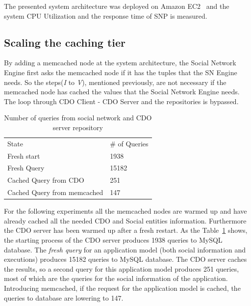 The presented system architecture was deployed on Amazon EC2~\cite{amazon_url} and the system CPU Utilization and the response time of SNP is measured.

\subsection{Scaling the caching tier}
\label{sec:eval_memcache}
By adding a memcached node at the system architecture, the Social Network Engine first asks the memcached node if it has the tuples that the SN Engine needs. So the steps(\emph{I} to \emph{V}), mentioned previously, are not necessary if the memcached node has cached the values that the Social Network Engine needs. The loop through CDO CIient - CDO Server and the repositories is bypassed. 

\begin{table}[]
\centering
\begin{tabular}{ll}
State        & \# of Queries \\
Fresh start  & 1938          \\
Fresh Query  & 15182         \\
Cached Query from CDO & 251           \\
Cached Query from memcached & 147  
\end{tabular}
\caption{Number of queries from social network and CDO server repository}
\label{tab:num_of_queries}
\end{table} 

For the following experiments all the memcached nodes are warmed up and have already cached all the needed CDO and Social entities information. Furthermore the CDO server has been warmed up after a fresh restart. As the Table~\ref{tab:num_of_queries} shows,
the starting process of the CDO server produces 1938 queries to MySQL database. The \emph{fresh query} for an application model (both social information and executions) produces 15182 queries to MySQL database. The CDO server caches the results, so a second query for this application model produces 251 queries, most of which are the queries for the social information of the application. Introducing memcached, if the request for the application model is cached, the queries to database are lowering to 147.  

